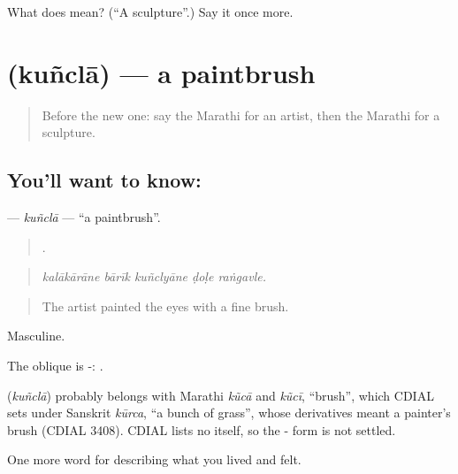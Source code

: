 \begin{tcolorbox}[breakable,colback=teal!4,colframe=teal!35!black,title={Before you move on}]
What does  mean? (\textquotedblleft{}A sculpture\textquotedblright{}.) Say it once more.
\end{tcolorbox}
\section[\texorpdfstring{\mr{कुंचला} (kuñclā)}{कुंचला (kuñclā)}]{ (kuñclā) — a paintbrush}

\label{lesson:MR-C535-kuncla}



\begin{quote}
Before the new one: say the Marathi for an artist, then the Marathi for a sculpture.
\end{quote}

\subsection*{You'll want to know: }
\textbf{} — \emph{kuñclā} — \textquotedblleft{}a paintbrush\textquotedblright{}.

\begin{quote}
    .
\end{quote}

\begin{quote}
\emph{kalākārāne bārīk kuñclyāne ḍoḷe raṅgavle.}
\end{quote}

\begin{quote}
The artist painted the eyes with a fine brush.
\end{quote}

Masculine.

The oblique is -: .

\begin{cousinweb}
\textbf{} (\emph{kuñclā}) probably belongs with Marathi \emph{kũcā} and \emph{kũcī}, \textquotedblleft{}brush\textquotedblright{}, which CDIAL sets under Sanskrit \emph{kūrca}, \textquotedblleft{}a bunch of grass\textquotedblright{}, whose derivatives meant a painter's brush (CDIAL 3408). CDIAL lists no  itself, so the - form is not settled.
\end{cousinweb}

\begin{grammarlens}[title={What you've built}]
One more word for describing what you lived and felt.
\end{grammarlens}

